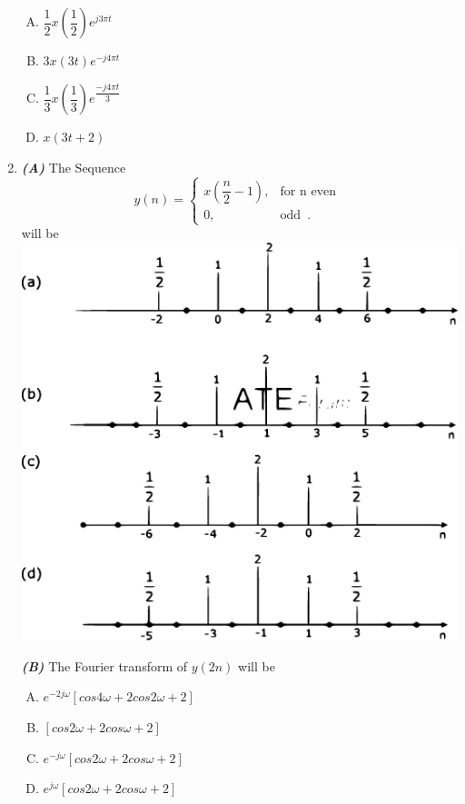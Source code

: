 \documentclass[journal,12pt,twocolumn]{IEEEtran}
\begin{document}
\begin{enumerate}
\begin{enumerate}[(A)]
\setlength\itemsep{2em}

\item $
\dfrac{1}{2} x(\dfrac{1}{2})e^{j3\pi t}
$ 
\item $
3 x(3t)e^{-j4\pi t}
$ 
\item  $
\dfrac{1}{3} x(\dfrac{1}{3})e^{\dfrac{-j4\pi t}{3}}
$ 
\item $
x(3t+2)
$

\end{enumerate}

\item \textbf{\textit{(A)}} The Sequence \[
	y(n)=\begin{cases}
		x(\dfrac{n}{2}-1), & \text{for n even }  \\
		0, & \text{odd }\,.
	\end{cases}
\] will be\\
\includegraphics[scale=0.3]{fig6.eps}

\textbf{\textit{(B)}} The Fourier transform of $y(2n)$ will be\\
\begin{enumerate}[(A)]

\setlength\itemsep{2em}

\item $
e^{-2j\omega}[cos 4\omega +2 cos 2\omega +2]
$ 
\item $
[cos2\omega +2 cos\omega +2]
$ 
\item  $
e^{-j\omega}[cos2\omega +2 cos\omega +2]
$ 
\item $
e^{j\omega}[cos2\omega +2 cos\omega +2]
$


\end{enumerate}
\end{enumerate}
\end{document}
